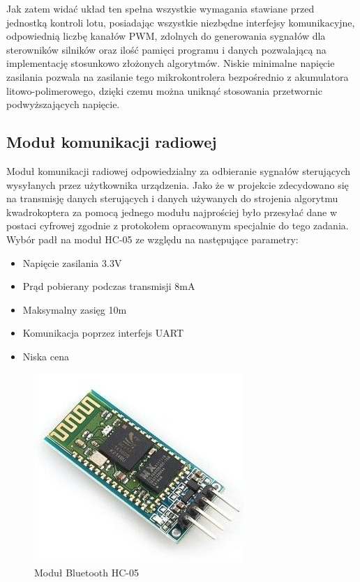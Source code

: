 Jak zatem widać układ ten spełna wszystkie wymagania stawiane przed jednostką kontroli lotu, posiadając wszystkie niezbędne interfejsy komunikacyjne, odpowiednią liczbę kanałów PWM, zdolnych do generowania sygnałów dla sterowników silników oraz ilość pamięci programu i danych pozwalającą na implementację stosunkowo złożonych algorytmów. Niskie minimalne napięcie zasilania pozwala na zasilanie tego mikrokontrolera bezpośrednio z akumulatora litowo-polimerowego, dzięki czemu można uniknąć stosowania przetwornic podwyższających napięcie.

\subsection{Moduł komunikacji radiowej}
Moduł komunikacji radiowej odpowiedzialny za odbieranie sygnałów sterujących wysyłanych przez użytkownika urządzenia. Jako że w projekcie zdecydowano się na transmisję danych sterujących i danych używanych do strojenia algorytmu kwadrokoptera za pomocą jednego modułu najprościej było przesyłać dane w postaci cyfrowej zgodnie z protokołem opracowanym specjalnie do tego zadania. Wybór padł na moduł HC-05 ze względu na następujące parametry:

\begin{itemize}
	\item Napięcie zasilania 3.3V
	\item Prąd pobierany podczas transmisji 8mA
	\item Maksymalny zasięg 10m
	\item Komunikacja poprzez interfejs UART
	\item Niska cena
\end{itemize}

\begin{figure}[H]
	\centering
	\includegraphics[scale=0.7]{Pictures/HC-05.jpg}
		\caption[Moduł Bluetooth HC-05]{Moduł Bluetooth HC-05}
	\label{fig:hc-05}
\end{figure}

